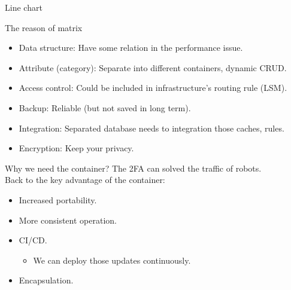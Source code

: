 \documentclass{beamer}
\begin{document}
\begin{CJK*}{UTF8}{bsmi}
\begin{frame}{Line chart}
  \end{frame}

  \begin{frame}{The reason of matrix}
    \begin{itemize}
      \item Data structure: Have some relation in the performance issue.
      \item Attribute (category): Separate into different containers, dynamic CRUD.
      \item Access control: Could be included in infrastructure's routing rule (LSM).
      \item Backup: Reliable (but not saved in long term).
      \item Integration: Separated database needs to integration those caches, rules.
      \item Encryption: Keep your privacy.
    \end{itemize}
  \end{frame}

  \begin{frame}{Why we need the container?}
    The 2FA can solved the traffic of robots.\\
    Back to the key advantage of the container:\\
    \begin{itemize}
      \item Increased portability.
      \item More consistent operation.
      \item CI/CD.
            \begin{itemize}
              \item We can deploy those updates continuously.
            \end{itemize}
      \item Encapsulation.
    \end{itemize}
  \end{frame}


\end{CJK*}
\end{document}
